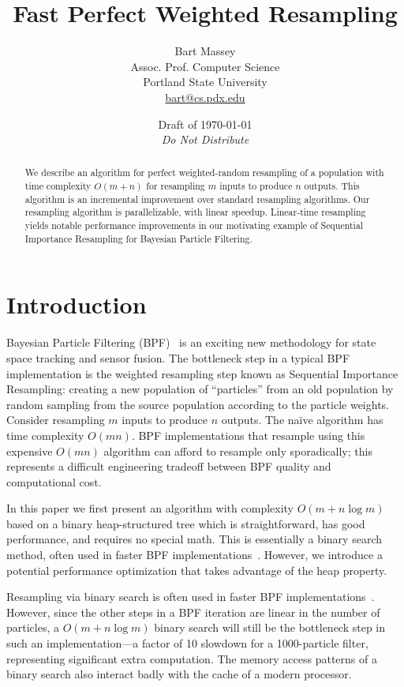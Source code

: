 \documentclass[12pt]{article}
\title{Fast Perfect Weighted Resampling}
\author{Bart Massey\\
  Assoc. Prof. Computer Science\\
  Portland State University\\
  \url{bart@cs.pdx.edu}}
\date{Draft of \today\\{\em Do Not Distribute}}
\begin{document}
  \maketitle

  \begin{abstract}
  We describe an algorithm for perfect weighted-random
  resampling of a population with time complexity $O(m +
  n)$ for resampling $m$ inputs to produce $n$ outputs.
  This algorithm is an incremental improvement over
  standard resampling algorithms.  Our resampling
  algorithm is parallelizable, with linear speedup.
  Linear-time resampling yields notable performance
  improvements in our motivating example of Sequential
  Importance Resampling for Bayesian
  Particle Filtering.
  \end{abstract}

\section{Introduction}
  Bayesian Particle Filtering (BPF)~\cite{bpf} is an exciting
  new methodology for state space tracking and sensor
  fusion.  The bottleneck step in a typical BPF
  implementation is the weighted resampling step known as
  Sequential Importance Resampling: creating a new
  population of ``particles'' from an old population by
  random sampling from the source population according to
  the particle weights.  Consider resampling $m$ inputs to
  produce $n$ outputs.  The na\"ive algorithm has time
  complexity $O(mn)$.  BPF implementations that resample
  using this expensive $O(mn)$ algorithm can afford to
  resample only sporadically; this represents a difficult
  engineering tradeoff between BPF quality and computational
  cost.

  In this paper we first present an algorithm with
  complexity $O(m + n \log m)$ based on a binary
  heap-structured tree which is straightforward, has good
  performance, and requires no special math.  This is
  essentially a binary search method, often used in faster
  BPF implementations~\cite{arulampalam02tutorial}.  However, we introduce a potential
  performance optimization that takes advantage of the heap
  property.

  Resampling via binary search is often used in faster BPF
  implementations~\cite{arulampalam02tutorial}.  However,
  since the other steps in a BPF iteration are linear in the
  number of particles, a $O(m + n \log m)$ binary search
  will still be the bottleneck step in such an
  implementation---a factor of 10 slowdown for a 1000-particle
  filter, representing significant extra computation.  The
  memory access patterns of a binary search also interact
  badly with the cache of a modern processor.
\end{document}
